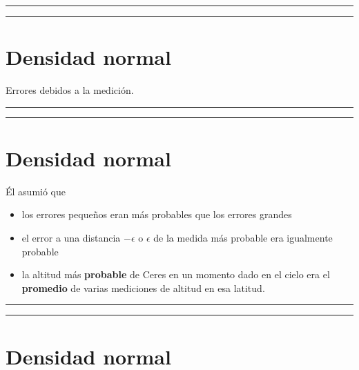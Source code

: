 \documentclass[
]{book}
\providecommand{\tightlist}{%
  \setlength{\itemsep}{0pt}\setlength{\parskip}{0pt}}
\begin{document}
\begin{center}\rule{0.5\linewidth}{0.5pt}\end{center}

\begin{center}\rule{0.5\linewidth}{0.5pt}\end{center}

\hypertarget{densidad-normal-1}{%
\section{Densidad normal}\label{densidad-normal-1}}

Errores debidos a la medición.

\begin{center}\rule{0.5\linewidth}{0.5pt}\end{center}

\begin{center}\rule{0.5\linewidth}{0.5pt}\end{center}

\hypertarget{densidad-normal-2}{%
\section{Densidad normal}\label{densidad-normal-2}}

Él asumió que

\begin{itemize}
\tightlist
\item
  los errores pequeños eran más probables que los errores grandes
\item
  el error a una distancia \(-\epsilon\) o \(\epsilon\) de la medida más probable era igualmente probable
\item
  la altitud más \textbf{probable} de Ceres en un momento dado en el cielo era el \textbf{promedio} de varias mediciones de altitud en esa latitud.
\end{itemize}

\begin{center}\rule{0.5\linewidth}{0.5pt}\end{center}

\begin{center}\rule{0.5\linewidth}{0.5pt}\end{center}

\hypertarget{densidad-normal-3}{%
\section{Densidad normal}\label{densidad-normal-3}}
\end{document}
